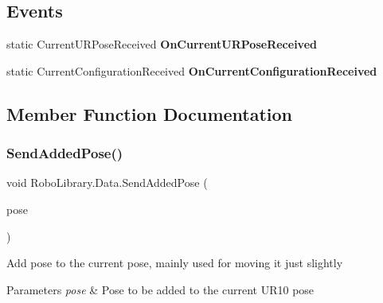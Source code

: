 \subsection*{Events}
\begin{DoxyCompactItemize}
\item 
\hypertarget{class_robo_library_1_1_data_a2a1edb02f13422b63c75359951ad59f7}{}\label{class_robo_library_1_1_data_a2a1edb02f13422b63c75359951ad59f7} 
static Current\+U\+R\+Pose\+Received {\bfseries On\+Current\+U\+R\+Pose\+Received}
\item 
\hypertarget{class_robo_library_1_1_data_a958e19e988fef2c17edf0806674910a3}{}\label{class_robo_library_1_1_data_a958e19e988fef2c17edf0806674910a3} 
static Current\+Configuration\+Received {\bfseries On\+Current\+Configuration\+Received}
\end{DoxyCompactItemize}


\subsection{Member Function Documentation}
\hypertarget{class_robo_library_1_1_data_a1e41bd63de43e5b386030d65825a4025}{}\label{class_robo_library_1_1_data_a1e41bd63de43e5b386030d65825a4025} 
\subsubsection{\texorpdfstring{Send\+Added\+Pose()}{SendAddedPose()}}
{\footnotesize\ttfamily void Robo\+Library.\+Data.\+Send\+Added\+Pose (\begin{DoxyParamCaption}\item[{\hyperlink{class_robo_library_1_1_u_r_pose}{U\+R\+Pose}}]{pose }\end{DoxyParamCaption})}



Add pose to the current pose, mainly used for moving it just slightly 


\begin{DoxyParams}{Parameters}
{\em pose} & Pose to be added to the current U\+R10 pose\\
\hline
\end{DoxyParams}
\hypertarget{class_robo_library_1_1_data_a232af8e278fa53d435a14a10fed14bd6}{}\label{class_robo_library_1_1_data_a232af8e278fa53d435a14a10fed14bd6} 

